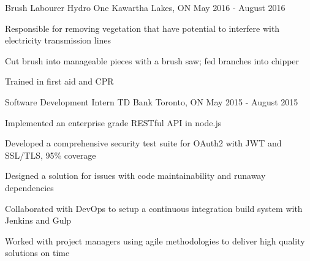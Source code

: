 

\begin{cventries}

  \cventry
    {Brush Labourer} %
    {Hydro One} %
    {Kawartha Lakes, ON} %
    {May 2016 - August 2016} %
    {
      \begin{cvitems} %
        \item {Responsible for removing vegetation that have potential to interfere with electricity transmission lines}
        \item {Cut brush into manageable pieces with a brush saw; fed branches into chipper}
        \item {Trained in first aid and CPR}
      \end{cvitems}
    }

  \cventry
    {Software Development Intern} %
    {TD Bank} %
    {Toronto, ON} %
    {May 2015 - August 2015} %
    {
      \begin{cvitems} %
        \item {Implemented an enterprise grade RESTful API in node.js}
        \item {Developed a comprehensive security test suite for OAuth2 with JWT and SSL/TLS, 95\% coverage}
        \item {Designed a solution for issues with code maintainability and runaway dependencies}
        \item {Collaborated with DevOps to setup a continuous integration build system with Jenkins and Gulp}
        \item {Worked with project managers using agile methodologies to deliver high quality solutions on time}
      \end{cvitems}
    }


\end{cventries}
